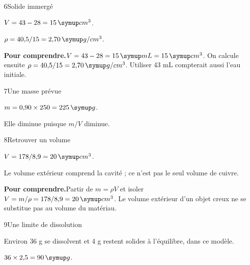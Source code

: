 \par\noindent\begin{minipage}{\linewidth}
\begin{corrige}{6}{Solide immergé}
\begin{questions}
\item $V=43-28=15\unite{cm^3}$.
\item $\rho=40{,}5/15=2{,}70\unite{g/cm^3}$.
\end{questions}
\par\smallskip\noindent\textbf{Pour comprendre.}\enspace $V=43-28=15\unite{mL}=15\unite{cm^3}$. On calcule ensuite $\rho=40{,}5/15=2{,}70\unite{g/cm^3}$. Utiliser 43 mL compterait aussi l’eau initiale.\par
{}
\end{corrige}
\end{minipage}
\par\noindent\begin{minipage}{\linewidth}
\begin{corrige}{7}{Une masse prévue}
\begin{questions}
\item $m=0{,}90\times250=225\unite g$.
\item Elle diminue puisque $m/V$ diminue.
\end{questions}
\end{corrige}
\end{minipage}
\par\noindent\begin{minipage}{\linewidth}
\begin{corrige}{8}{Retrouver un volume}
\begin{questions}
\item $V=178/8{,}9=20\unite{cm^3}$.
\item Le volume extérieur comprend la cavité ; ce n’est pas le seul volume de cuivre.
\end{questions}
\par\smallskip\noindent\textbf{Pour comprendre.}\enspace Partir de $m=\rho V$ et isoler $V=m/\rho=178/8{,}9=20\unite{cm^3}$. Le volume extérieur d’un objet creux ne se substitue pas au volume du matériau.\par
{}
\end{corrige}
\end{minipage}
\par\noindent\begin{minipage}{\linewidth}
\begin{corrige}{9}{Une limite de dissolution}
\begin{questions}
\item Environ 36 g se dissolvent et 4 g restent solides à l’équilibre, dans ce modèle.
\item $36\times2{,}5=90\unite g$.
\end{questions}
\end{corrige}
\end{minipage}
